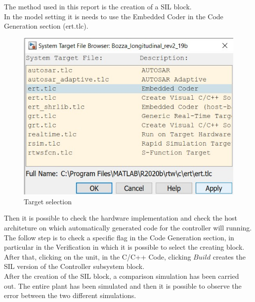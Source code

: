 \documentclass[12pt,a4paper]{report}
\begin{document}
The method used in this report is the creation of a SIL block. \\
In the model setting it is needs to use the Embedded Coder in the Code Generation section (ert.tlc).\\
\begin{figure}[htbp]
	\centering
	\includegraphics[scale=0.7]{ert.jpg}
	\caption{Target selection}
\end{figure} \FloatBarrier

Then it is possible to check the hardware implementation and check the host architeture on which automatically generated code for the controller will running. \\
The follow step is to check a specific flag in the Code Generation section, in particular in the Verification in which it is possible to select the creating block. 
After that, clicking on the unit, in the C/C++ Code, clicking $Build$ creates the SIL version of the Controller subsystem block. \\
After the creation of the SIL block, a comparison simulation has been carried out. The entire plant has been simulated and then it is possible to observe the error between the two different simulations. \\
\end{document}
